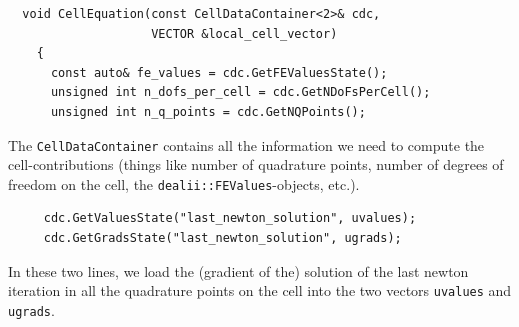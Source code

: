 \documentclass[prodmode,acmtoms]{acmsmall}
\numberwithin{equation}{section}
\begin{document}
\begin{lstlisting}
  void CellEquation(const CellDataContainer<2>& cdc,
                    VECTOR &local_cell_vector)
    {
      const auto& fe_values = cdc.GetFEValuesState();
      unsigned int n_dofs_per_cell = cdc.GetNDoFsPerCell();
      unsigned int n_q_points = cdc.GetNQPoints();
\end{lstlisting}
 The \texttt{CellDataContainer} contains all the information we need to compute the cell-contributions (things like number of quadrature points, number of degrees of freedom on the cell, the \texttt{dealii::FEValues}-objects, etc.).
  \begin{lstlisting}
     cdc.GetValuesState("last_newton_solution", uvalues);
     cdc.GetGradsState("last_newton_solution", ugrads);
 \end{lstlisting}
 In these two lines, we load the (gradient of the) solution of the last newton iteration in all the quadrature points on the cell into the two vectors \texttt{uvalues} and \texttt{ugrads}.
\end{document}
